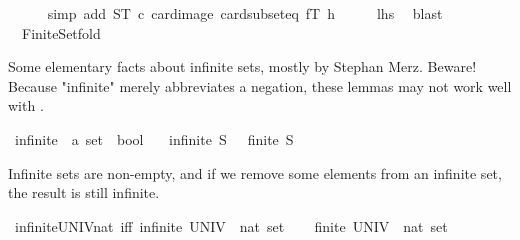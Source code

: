 \begin{isabellebody}
\ \ \ \ \isamarkupfalse%
\ {\isacharparenleft}{\kern0pt}simp\ add{\isacharcolon}{\kern0pt}\ ST\ c\ card{\isacharunderscore}{\kern0pt}image\ card{\isacharunderscore}{\kern0pt}subset{\isacharunderscore}{\kern0pt}eq\ fT\ h{\isacharparenright}{\kern0pt}\isanewline
\ \ \isamarkupfalse%
\ \isamarkupfalse%
\ {\isacharquery}{\kern0pt}lhs\ \isamarkupfalse%
\ blast\isanewline
{}\isamarkupfalse%
%
\endisatagproof
{\isafoldproof}%
%
\isadelimproof
\isanewline
%
\endisadelimproof
\isanewline
{}\isamarkupfalse%
\ {\isacharparenleft}{\kern0pt}\ Finite{\isacharunderscore}{\kern0pt}Set{\isachardot}{\kern0pt}fold%
\isadelimdocument
%
\endisadelimdocument
%
\isatagdocument
%
\isamarkuptrue%
%
\endisatagdocument
{\isafolddocument}%
%
\isadelimdocument
%
\endisadelimdocument
%
\begin{isamarkuptext}%
Some elementary facts about infinite sets, mostly by Stephan Merz.
  Beware! Because "infinite" merely abbreviates a negation, these
  lemmas may not work well with .%
\end{isamarkuptext}\isamarkuptrue%
\isamarkupfalse%
\ infinite\ {\isacharcolon}{\kern0pt}{\isacharcolon}{\kern0pt}\ {\isachardoublequoteopen}{\isacharprime}{\kern0pt}a\ set\ {\isasymRightarrow}\ bool{\isachardoublequoteclose}\isanewline
\ \ \ {\isachardoublequoteopen}infinite\ S\ {\isasymequiv}\ {\isasymnot}\ finite\ S{\isachardoublequoteclose}%
\begin{isamarkuptext}%
Infinite sets are non-empty, and if we remove some elements from an
  infinite set, the result is still infinite.%
\end{isamarkuptext}\isamarkuptrue%
\isamarkupfalse%
\ infinite{\isacharunderscore}{\kern0pt}UNIV{\isacharunderscore}{\kern0pt}nat\ {\isacharbrackleft}{\kern0pt}iff{\isacharbrackright}{\kern0pt}{\isacharcolon}{\kern0pt}\ {\isachardoublequoteopen}infinite\ {\isacharparenleft}{\kern0pt}UNIV\ {\isacharcolon}{\kern0pt}{\isacharcolon}{\kern0pt}\ nat\ set{\isacharparenright}{\kern0pt}{\isachardoublequoteclose}\isanewline
%
\isadelimproof
%
\endisadelimproof
%
\isatagproof
{}\isamarkupfalse%
\isanewline
\ \ \isamarkupfalse%
\ {\isachardoublequoteopen}finite\ {\isacharparenleft}{\kern0pt}UNIV\ {\isacharcolon}{\kern0pt}{\isacharcolon}{\kern0pt}\ nat\ set{\isacharparenright}{\kern0pt}{\isachardoublequoteclose}\isanewline

\end{isabellebody}
